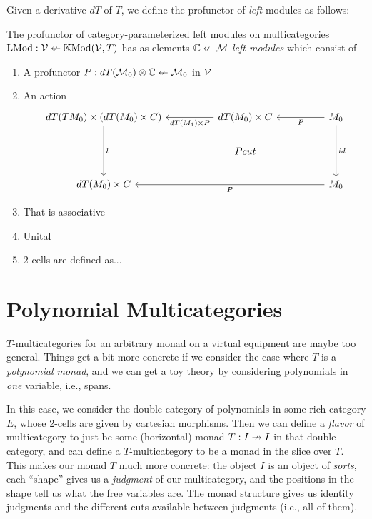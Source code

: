 \documentclass{article}
\begin{document}
Given a derivative $dT$ of $T$, we define the profunctor of
\emph{left} modules as follows:

\begin{definition}
  The profunctor of category-parameterized left modules on
  multicategories $\text{LMod} : \mathcal V \nleftarrow \mathbb{K}\text{Mod}(\mathcal{V},T)$ has as elements
  $\mathbb C \nleftarrow \mathcal M$ \emph{left modules} which consist of
  \begin{enumerate}
  \item A profunctor $P : dT(\mathcal M_0) \otimes \mathbb C \nleftarrow \mathcal M_0$ in $\mathcal V$
  \item An action \[\begin{tikzcd}
dT(TM_0) \times (dT(M_0) \times C) \arrow[dd, "l"] &  & dT(M_0) \times C \arrow[ll, "dT(M_1) \times P"] &  & M_0 \arrow[dd, "id"] \arrow[ll, "P"] \\
 &  & Pcut &  &  \\
dT(M_0) \times C &  &  &  & M_0 \arrow[llll, "P"]
  \end{tikzcd}\]
  \item That is associative
  \item Unital
  \item 2-cells are defined as...
  \end{enumerate}
\end{definition}

\section{Polynomial Multicategories}

$T$-multicategories for an arbitrary monad on a virtual equipment are
maybe too general. Things get a bit more concrete if we consider the
case where $T$ is a \emph{polynomial monad}, and we can get a toy
theory by considering polynomials in \emph{one} variable, i.e., spans.

In this case, we consider the double category of polynomials in some
rich category $E$, whose 2-cells are given by cartesian
morphisms. Then we can define a \emph{flavor} of multicategory to just
be some (horizontal) monad $T : I \nrightarrow I$ in that double category, and
can define a $T$-multicategory to be a monad in the slice over
$T$. This makes our monad $T$ much more concrete: the object $I$ is an
object of \emph{sorts}, each ``shape'' gives us a \emph{judgment} of
our multicategory, and the positions in the shape tell us what the
free variables are. The monad structure gives us identity judgments
and the different cuts available between judgments (i.e., all of
them).
\end{document}
